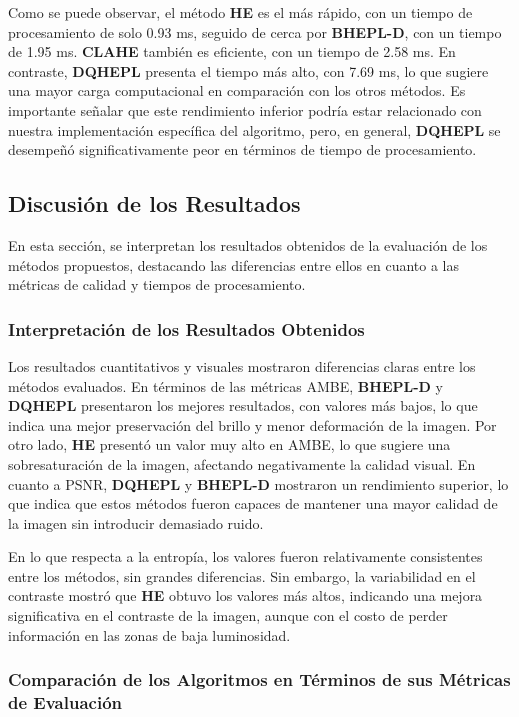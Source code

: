 \documentclass[sigchi]{acmart}
\begin{document}
Como se puede observar, el método \textbf{HE} es el más rápido, con un tiempo de procesamiento
de solo 0.93 ms, seguido de cerca por \textbf{BHEPL-D}, con un tiempo de 1.95 ms.
\textbf{CLAHE} también es eficiente, con un tiempo de 2.58 ms. En contraste, \textbf{DQHEPL}
presenta el tiempo más alto, con 7.69 ms, lo que sugiere una mayor carga computacional en
comparación con los otros métodos. Es importante señalar que este rendimiento inferior podría
estar relacionado con nuestra implementación específica del algoritmo, pero, en general,
\textbf{DQHEPL} se desempeñó significativamente peor en términos de tiempo de procesamiento.


\subsection{Discusión de los Resultados} \label{subsec:discusion}

En esta sección, se interpretan los resultados obtenidos de la evaluación de los métodos
propuestos, destacando las diferencias entre ellos en cuanto a las métricas de calidad y
tiempos de procesamiento.

\subsubsection{Interpretación de los Resultados Obtenidos}

Los resultados cuantitativos y visuales mostraron diferencias claras entre los métodos
evaluados. En términos de las métricas AMBE, \textbf{BHEPL-D} y \textbf{DQHEPL} presentaron los
mejores resultados, con valores más bajos, lo que indica una mejor preservación del brillo y
menor deformación de la imagen. Por otro lado, \textbf{HE} presentó un valor muy alto en AMBE,
lo que sugiere una sobresaturación de la imagen, afectando negativamente la calidad visual. En
cuanto a PSNR, \textbf{DQHEPL} y \textbf{BHEPL-D} mostraron un rendimiento superior, lo que
indica que estos métodos fueron capaces de mantener una mayor calidad de la imagen sin
introducir demasiado ruido.

En lo que respecta a la entropía, los valores fueron relativamente consistentes entre los
métodos, sin grandes diferencias. Sin embargo, la variabilidad en el contraste mostró que
\textbf{HE} obtuvo los valores más altos, indicando una mejora significativa en el contraste de
la imagen, aunque con el costo de perder información en las zonas de baja luminosidad.

\subsubsection{Comparación de los Algoritmos en Términos de sus Métricas de Evaluación}
\end{document}
